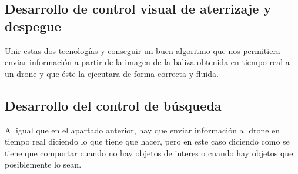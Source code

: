 \subsection{Desarrollo de control visual de aterrizaje y despegue}
\hspace{1 cm} Unir estas dos tecnolog\'ias y conseguir un buen algoritmo que nos permitiera enviar informaci\'on a partir de la imagen de la baliza obtenida en tiempo real a un drone y que \'este la ejecutara de forma correcta y fluida.  

\subsection{Desarrollo del control de b\'usqueda}
\hspace{1 cm} Al igual que en el apartado anterior, hay que enviar informaci\'on al drone en tiempo real diciendo lo que tiene que hacer, pero en este caso diciendo como se tiene que comportar cuando no hay objetos de interes o cuando hay objetos que posiblemente lo sean. 

































